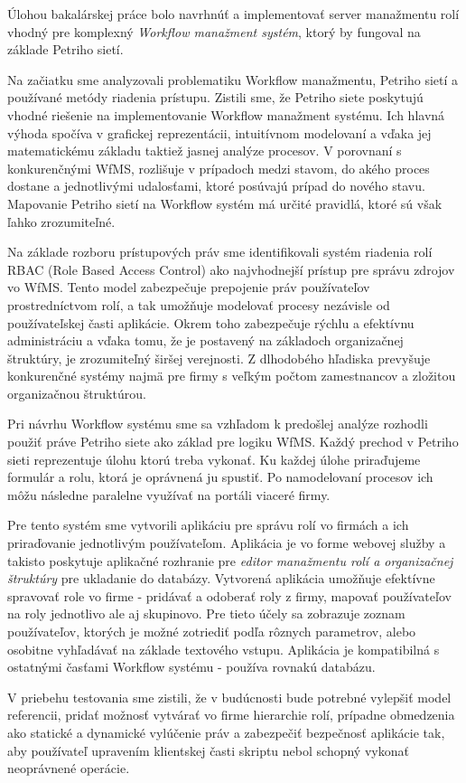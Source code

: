 Úlohou bakalárskej práce bolo navrhnúť a implementovať server manažmentu rolí vhodný pre komplexný \emph{Workflow manažment systém}, ktorý by fungoval na základe Petriho sietí.

\noindent Na začiatku sme analyzovali problematiku Workflow manažmentu, Petriho sietí a používané metódy riadenia prístupu. Zistili sme, že Petriho siete poskytujú vhodné riešenie na implementovanie Workflow manažment systému. Ich hlavná výhoda spočíva v grafickej reprezentácii, intuitívnom modelovaní a vďaka jej matematickému základu taktiež jasnej analýze procesov. V porovnaní s konkurenčnými WfMS, rozlišuje v prípadoch medzi stavom, do akého proces dostane a jednotlivými udalosťami, ktoré posúvajú prípad do nového stavu.  Mapovanie Petriho sietí na Workflow systém má určité pravidlá, ktoré sú však ľahko zrozumiteľné.

Na základe rozboru prístupových práv sme identifikovali systém riadenia rolí RBAC (Role Based Access Control) ako najvhodnejší prístup pre správu zdrojov vo WfMS. Tento model zabezpečuje prepojenie práv používateľov prostredníctvom rolí, a tak umožňuje modelovať procesy nezávisle od používateľskej časti aplikácie. Okrem toho zabezpečuje rýchlu a efektívnu administráciu a vďaka tomu, že je postavený na základoch organizačnej štruktúry, je zrozumiteľný širšej verejnosti. Z dlhodobého hľadiska prevyšuje konkurenčné systémy najmä pre firmy s veľkým počtom zamestnancov a zložitou organizačnou štruktúrou. 
 
Pri návrhu Workflow systému sme sa vzhľadom k predošlej analýze rozhodli použiť práve Petriho siete ako základ pre logiku WfMS. Každý prechod v Petriho sieti reprezentuje úlohu ktorú treba vykonať. Ku každej úlohe priraďujeme formulár a rolu, ktorá je oprávnená ju spustiť. Po namodelovaní procesov  ich môžu následne paralelne využívať na portáli viaceré firmy. 

Pre tento systém sme vytvorili aplikáciu pre správu rolí vo firmách a ich  priraďovanie jednotlivým používateľom. Aplikácia je vo forme webovej služby a takisto poskytuje aplikačné rozhranie pre \emph{editor manažmentu rolí a organizačnej štruktúry} pre ukladanie do databázy. Vytvorená aplikácia umožňuje efektívne spravovať role vo firme - pridávať a odoberať roly z firmy, mapovať používateľov na roly jednotlivo ale aj skupinovo. Pre tieto účely sa zobrazuje zoznam používateľov, ktorých je možné zotriediť podľa rôznych parametrov, alebo osobitne vyhľadávať na základe textového vstupu. Aplikácia je kompatibilná s ostatnými časťami Workflow systému - používa rovnakú databázu. 


V priebehu testovania sme zistili, že v budúcnosti bude  potrebné vylepšiť model referencii, pridať možnosť vytvárať vo firme hierarchie rolí, prípadne obmedzenia ako statické a dynamické vylúčenie práv  a zabezpečiť bezpečnosť aplikácie tak, aby používateľ upravením klientskej časti skriptu nebol schopný vykonať neoprávnené operácie. 








